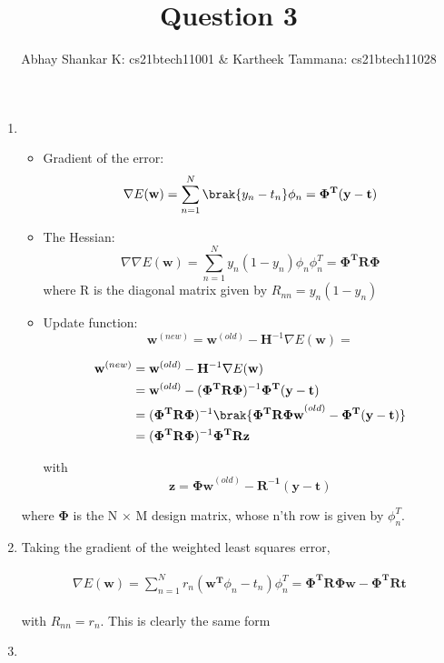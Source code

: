 \documentclass{amsart}
\begin{document}
    \title{Question 3}
    \author{Abhay Shankar K: cs21btech11001 \& Kartheek Tammana: cs21btech11028}
    \maketitle

    \begin{enumerate}[label=\textbf{(\Roman*)}]
        \item 
        \begin{itemize}
            \item Gradient of the error: \[\nabla E(\mathbf{w}) = \sum_{n = 1}^{N} \brak{y_n - t_n} \phi_n = \mathbf{\Phi^T(y - t)}\]
            \item The Hessian: \[\nabla \nabla E(\mathbf{w}) = \sum_{n = 1}^{N} y_n (1 - y_n) \phi_n \phi_n^T = \mathbf{\Phi^T R \Phi}\] where R is the diagonal matrix given by \(R_{nn} = y_n (1 - y_n)\)
            \item Update function: \[\mathbf{w}^{(new)} = \mathbf{w}^{(old)} - \mathbf{H}^{-1} \nabla E(\mathbf{w}) = \]
            
            \begin{align}
                \begin{split}
                    \mathbf{w}^{(new)} &= \mathbf{w}^{(old)} - \mathbf{H}^{-1} \nabla E(\mathbf{w}) \\
                            &= \mathbf{w}^{(old)} - (\mathbf{\Phi^T R \Phi})^{-1} \mathbf{\Phi^T(y - t)} \\
                            &= (\mathbf{\Phi^T R \Phi})^{-1} \brak{\mathbf{\Phi^T R \Phi w}^{(old)} - \mathbf{\Phi^T(y - t)}} \\
                            &= (\mathbf{\Phi^T R \Phi})^{-1} \mathbf{\Phi^T R z} \label{eq:update}
                \end{split}
            \end{align}

            with \[\mathbf{z} = \mathbf{\Phi w}^{(old)} - \mathbf{R^{-1} (y - t)}\]
        \end{itemize}

        where \(\mathbf{\Phi}\) is the N × M design matrix, whose n'th row is given by \(\phi_n^T\).
        \item Taking the gradient of the weighted least squares error,
        
        \begin{align}
            \begin{split}
                \nabla E(\mathbf{w}) = \sum_{n = 1}^{N} r_n (\mathbf{w^T} \phi_n - t_n) \phi_n^T = \mathbf{\Phi^T R \Phi w} - \mathbf{\Phi^T R t}
            \end{split}
        \end{align}

        with \(R_{nn} = r_n\). This is clearly the same form 
        \item 
    \end{enumerate}
\end{document}
